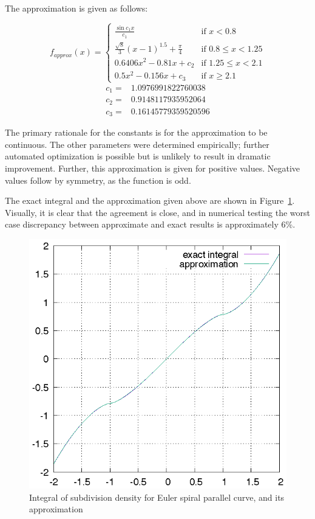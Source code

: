 \documentclass[sigconf]{acmart}
\begin{document}
The approximation is given as follows:

\[ 
    f_\mathit{approx}(x) = \left\{
        \begin{array}{rl}
            \frac{\sin c_1 x}{c_1} & \text{if } x < 0.8 \\
            \frac{\sqrt{8}}{3}(x-1)^{1.5} + \frac{\pi}{4} & \text{if } 0.8 \leq x < 1.25 \\
            0.6406x^2 - 0.81x + c_2 & \text{if } 1.25 \leq x < 2.1 \\
            0.5x^2 - 0.156x + c_3 & \text{if } x \geq 2.1
        \end{array}
        \right.
\]
\[
    \begin{array}{ll}
        c_1 = & 1.0976991822760038 \\
        c_2 = & 0.9148117935952064 \\
        c_3 = & 0.16145779359520596
    \end{array}
\]

The primary rationale for the constants is for the approximation to be continuous. The other parameters were determined empirically; further automated optimization is possible but is unlikely to result in dramatic improvement. Further, this approximation is given for positive values. Negative values follow by symmetry, as the function is odd.

The exact integral and the approximation given above are shown in Figure~\ref{fig:espc}. Visually, it is clear that the agreement is close, and in numerical testing the worst case discrepancy between approximate and exact results is approximately 6\%.

\begin{figure}
    \includegraphics[scale=0.8]{espc}
    \caption{Integral of subdivision density for Euler spiral parallel curve, and its approximation}
    \label{fig:espc}
\end{figure}
\end{document}
